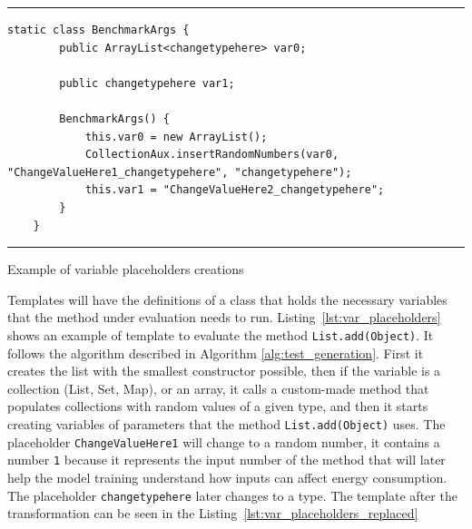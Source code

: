 \begin{listing}[H]
\noindent\rule{\linewidth}{0.4pt}
\begin{verbatim}
static class BenchmarkArgs {
        public ArrayList<changetypehere> var0;

        public changetypehere var1;

        BenchmarkArgs() {
            this.var0 = new ArrayList();
            CollectionAux.insertRandomNumbers(var0, "ChangeValueHere1_changetypehere", "changetypehere");
            this.var1 = "ChangeValueHere2_changetypehere";
        }
    }
\end{verbatim}
\noindent\rule{\linewidth}{0.4pt}
\caption{Example of variable placeholders creations}            
\label{lst:var_placeholders}
\end{listing}

Templates will have the definitions of a class that holds the necessary variables that the method under evaluation needs to run. Listing~\ref{lst:var_placeholders} shows an example of template to evaluate the method \texttt{List.add(Object)}. It follows the algorithm described in Algorithm \ref{alg:test_generation}. First it creates the list with the smallest constructor possible, then if the variable is a collection (List, Set, Map), or an array, it calls a custom-made method that populates collections with random values of a given type, and then it starts creating variables of parameters that the method \texttt{List.add(Object)} uses. The placeholder \texttt{ChangeValueHere1} will change to a random number, it contains a number \texttt{1} because it represents the input number of the method that will later help the model training understand how inputs can affect energy consumption. The placeholder \texttt{changetypehere} later changes to a type. The template after the transformation can be seen in the Listing~\ref{lst:var_placeholders_replaced}



